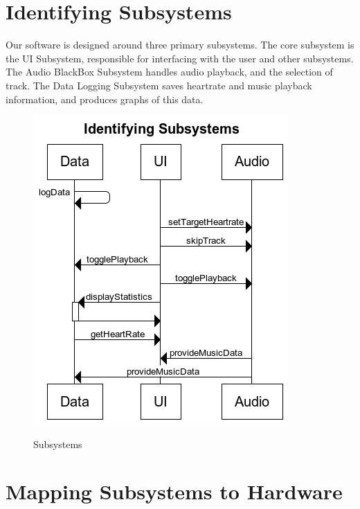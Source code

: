 \documentclass[letterpaper,english, 12pt]{scrreprt}
\begin{document}
\section{Identifying Subsystems}
Our software is designed around three primary subsystems.
The core subsystem is the UI Subsystem, responsible for interfacing with the user and other subsystems.
The Audio BlackBox Subsystem handles audio playback, and the selection of track.
The Data Logging Subsystem saves heartrate and music playback information, and produces graphs of this data.
\\

\begin{center}
	\begin{figure}[H]
		\includegraphics{img/subsystems.png}\\
		\caption{Subsystems}
	\end{figure}
\end{center}

\section{Mapping Subsystems to Hardware}
\end{document}
